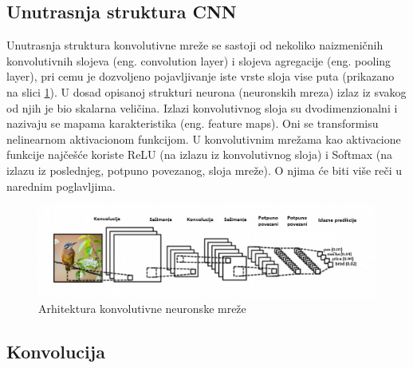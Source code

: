 \documentclass[a4paper]{article}
\begin{document}
\subsection{Unutrasnja struktura CNN}

Unutrasnja struktura konvolutivne mreže se sastoji od nekoliko naizmeničnih konvolutivnih slojeva (eng. convolution layer) i slojeva agregacije (eng. pooling layer), pri cemu je dozvoljeno pojavljivanje iste vrste sloja vise puta (prikazano na slici \ref{fig:cnn_layers}). U dosad opisanoj strukturi neurona (neuronskih mreza) izlaz iz svakog od njih je bio skalarna veličina. Izlazi konvolutivnog sloja su dvodimenzionalni i nazivaju se mapama karakteristika (eng. feature maps). Oni se transformisu nelinearnom aktivacionom funkcijom. U konvolutivnim mrežama kao aktivacione funkcije najčešće koriste ReLU (na izlazu iz konvolutivnog sloja) i Softmax (na izlazu iz poslednjeg, potpuno povezanog, sloja mreže). O njima će biti više reči u narednim poglavljima.




\begin{figure}[h!]
\begin{center}
\includegraphics[scale=0.62]{cnn_layers.jpg}
\end{center}
\caption{Arhitektura konvolutivne neuronske mreže}
\label{fig:cnn_layers}
\end{figure}


\subsection{Konvolucija}
\label{konvolucija}
\end{document}
